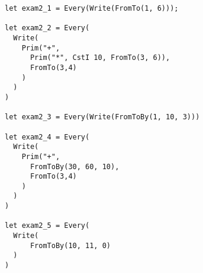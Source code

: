 \begin{verbatim}
let exam2_1 = Every(Write(FromTo(1, 6)));

let exam2_2 = Every(
  Write(
    Prim("+", 
      Prim("*", CstI 10, FromTo(3, 6)),
      FromTo(3,4)
    )
  )
)

let exam2_3 = Every(Write(FromToBy(1, 10, 3)))

let exam2_4 = Every(
  Write(
    Prim("+", 
      FromToBy(30, 60, 10),
      FromTo(3,4)
    )
  )
)

let exam2_5 = Every(
  Write(
      FromToBy(10, 11, 0)
  )
)
\end{verbatim}